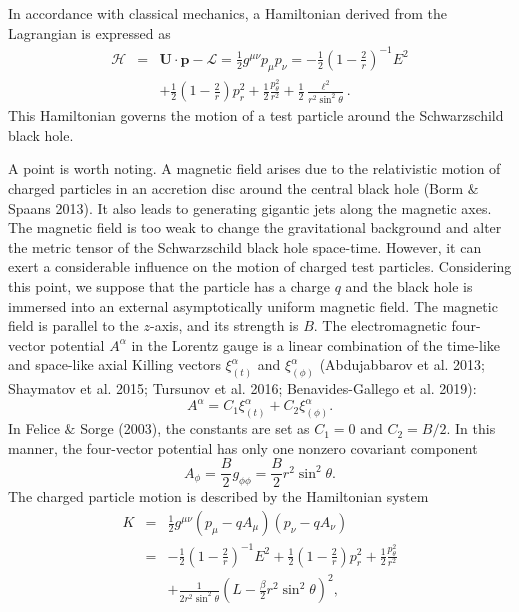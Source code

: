 \documentclass[preprint2]{aastex}
\begin{document}
In accordance with classical mechanics, a Hamiltonian derived from
the Lagrangian is expressed as
\begin{eqnarray}
\mathcal{H} &=&\mathbf{U}\cdot\mathbf{p}-\mathcal{L}
=\frac{1}{2}g^{\mu\nu}p_{\mu}p_{\nu} =
-\frac{1}{2}(1-\frac{2}{r})^{-1} E^{2}
\nonumber \\
&& +\frac{1}{2}(1-\frac{2}{r})p^{2}_{r}
+\frac{1}{2}\frac{p^{2}_{\theta}}{r^2}+\frac{1}{2}\frac{\ell^{2}}{r^2\sin^2\theta}.
\end{eqnarray}
This Hamiltonian governs the motion of a test particle around the
Schwarzschild black hole.

A point is worth noting. A magnetic field arises due to the
relativistic motion of charged particles in an accretion disc
around the central black hole (Borm $\&$ Spaans 2013). It also
leads to generating gigantic jets along the magnetic axes. The
magnetic field is too weak to change the gravitational background
and alter the metric tensor of the Schwarzschild black hole
space-time.  However, it can exert a considerable influence on the
motion of charged test particles. Considering this point, we
suppose that the particle has a charge $q$ and the black hole is
immersed into an external asymptotically uniform magnetic field.
The magnetic field is parallel to the $z$-axis, and its strength
is $B$. The electromagnetic four-vector potential $A^{\alpha}$ in
the Lorentz gauge is a linear combination of the time-like and
space-like axial Killing vectors $\xi^{\alpha}_{(t)}$ and
$\xi^{\alpha}_{(\phi)}$ (Abdujabbarov et al. 2013; Shaymatov et
al. 2015; Tursunov et al. 2016; Benavides-Gallego et al. 2019):
\begin{equation}
A^{\alpha}=C_1\xi^{\alpha}_{(t)}+C_2\xi^{\alpha}_{(\phi)}.
\end{equation}
In  Felice $\&$ Sorge (2003), the constants are set as $C_1=0$ and
$C_2=B/2$. In this manner, the four-vector potential has only one
nonzero covariant component
\begin{equation}
A_{\phi}=\frac{B}{2}g_{\phi\phi}=\frac{B}{2}r^{2}\sin^{2} \theta.
\end{equation}
The charged particle motion is described by the Hamiltonian system
\begin{eqnarray}
K &=& \frac{1}{2}g^{\mu\nu}(p_{\mu}-qA_{\mu})(p_{\nu} -qA_{\nu})
\nonumber \\
&=& -\frac{1}{2}(1-\frac{2}{r})^{-1} E^{2}
+\frac{1}{2}(1-\frac{2}{r})p^{2}_{r}
+\frac{1}{2}\frac{p^{2}_{\theta}}{r^2} \nonumber \\
&& +\frac{1}{2r^2\sin^2\theta}(L-\frac{\beta}{2}r^{2}\sin^{2}
\theta)^{2},
\end{eqnarray}
\end{document}
